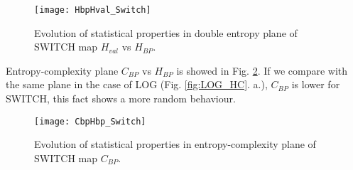 \begin{figure}
	\centering
	\texttt{[image: HbpHval\_Switch]}
	\caption{Evolution of statistical properties in double entropy plane of SWITCH map $H_{val}$ vs $H_{BP}$.}
	\label{fig:SWITCH_HH}
\end{figure}

Entropy-complexity plane $C_{BP}$ vs $H_{BP}$ is showed in Fig. \ref{fig:SWITCH_HC}.
If we compare with the same plane in the case of LOG (Fig. \ref{fig:LOG_HC}. a.), $C_{BP}$ is lower for SWITCH, this fact shows a more random behaviour.

\begin{figure}
	\centering
	\texttt{[image: CbpHbp\_Switch]}
	\caption{Evolution of statistical properties in entropy-complexity plane of SWITCH map $C_{BP}$.}
	\label{fig:SWITCH_HC}
\end{figure}